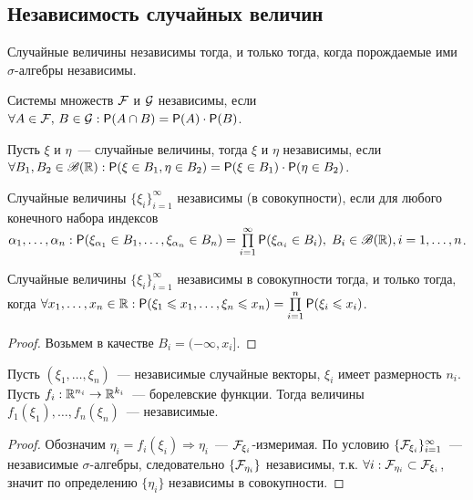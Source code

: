 \subsection{Независимость случайных величин}
\begin{statement}
Случайные величины независимы тогда, и только тогда, когда порождаемые ими $\sigma$-алгебры независимы.
\end{statement}
\begin{definition}
	Системы множеств $\mathcal{F}$ и $\mathcal{G}$ независимы, если $\forall A \in \mathcal{F},\, B \in \mathcal{G} : \mathsf{P}(A \cap B) = \mathsf{P}(A)\cdot\mathsf{P}(B)$.
\end{definition}
\begin{definition}
	Пусть $\xi$ и $\eta$~--- случайные величины, тогда $\xi$ и $\eta$ независимы, если $\forall B_1, B_2 \in \mathscr{B}(\mathbb{R}) : \mathsf{P}(\xi \in B_1, \eta \in B_2) = \mathsf{P}(\xi \in B_1)\cdot\mathsf{P}(\eta \in B_2)$.
\end{definition}
\begin{definition}
	Случайные величины $\{\xi_i\}_{i = 1}^\infty$ независимы (в совокупности), если для любого конечного набора индексов $\alpha_1, \ldots, \alpha_n : \mathsf{P}(\xi_{\alpha_1} \in B_1, \ldots, \xi_{\alpha_n} \in B_n) = \prod\limits_{i = 1}^\infty\mathsf{P}(\xi_{\alpha_i} \in B_i),\; B_i \in \mathscr{B}(\mathbb{R}), i = 1, \ldots, n$.
\end{definition}
\begin{theorem}
	Случайные величины $\{\xi_i\}_{i = 1}^\infty$ независимы в совокупности тогда, и только тогда, когда $\forall x_1, \ldots, x_n \in \mathbb{R} : \mathsf{P}(\xi_1 \leqslant x_1, \ldots, \xi_n \leqslant x_n) = \prod\limits_{i = 1}^n\mathsf{P}(\xi_i \leqslant x_i)$.
	\begin{proof}
		Возьмем в качестве $B_i = (-\infty, x_i]$.
	\end{proof}
\end{theorem}
\begin{theorem}
	Пусть $(\xi_1, \ldots, \xi_n)$~--- независимые случайные векторы, $\xi_i$ имеет размерность $n_i$. Пусть $f_i: \mathbb{R}^{n_i} \rightarrow \mathbb{R}^{k_i}$~--- борелевские функции. Тогда величины $f_1(\xi_1), \ldots, f_n(\xi_n)$~--- независимые.
	\begin{proof}
		Обозначим $\eta_i = f_i(\xi_i) \Rightarrow \eta_i$~--- $\mathcal{F}_{\xi_i}$-измеримая. По условию $\{\mathcal{F}_{\xi_i}\}_{i = 1}^\infty$~--- независимые $\sigma$-алгебры, следовательно $\{\mathcal{F}_{\eta_i}\}$ независимы, т.к. $\forall i : \mathcal{F}_{\eta_i} \subset \mathcal{F}_{\xi_i}$, значит по определению $\{\eta_i\}$ независимы в совокупности.
	\end{proof}
\end{theorem}
